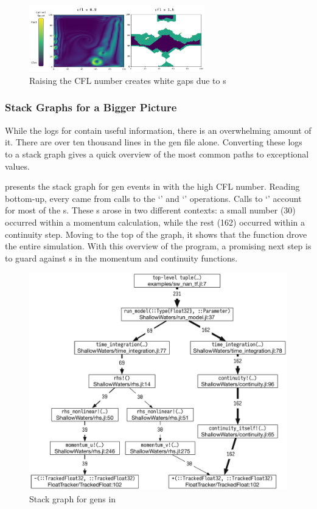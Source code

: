 \documentclass{juliacon}
\begin{document}
\begin{figure}[t]
  \centering
  \includegraphics[width=3in]{./fig/shallow_waters_cfl_diff.pdf}
  \caption{Raising the CFL number creates white gaps due to \NaN{}s}
  \label{fig:sw_nans}
\end{figure}


\subsubsection{Stack Graphs for a Bigger Picture}

While the logs for \ShallowWaters{} contain useful information,
there is an overwhelming amount of it.
There are over ten thousand lines in the gen file alone.
Converting these logs to a stack graph gives a quick overview
of the most common paths to exceptional values.

 presents the stack graph for \NaN{} gen events
in \ShallowWaters{} with the high CFL number.
Reading bottom-up, every \NaN{} came from calls to the `\code{-}' and `\code{+}' operations.
Calls to `\code{+}' account for most of the \NaN{}s.
These \NaN{}s arose in two different contexts: a small number (30)
occurred within a momentum calculation, while the rest (162)
occurred within a continuity step.
Moving to the top of the graph, it shows that the function  drove
the entire simulation.
With this overview of the program, a promising next step is to guard against \NaN{}s
in the momentum and continuity functions.

\begin{figure}[t]
  \centering
  \includegraphics[width=0.96\columnwidth]{fig/sw_nan_cstg_clean.pdf}
  \caption{Stack graph for \NaN{} gens in \ShallowWaters{}}
  \label{fig:sw_nan_cstg}
\end{figure}
\end{document}
